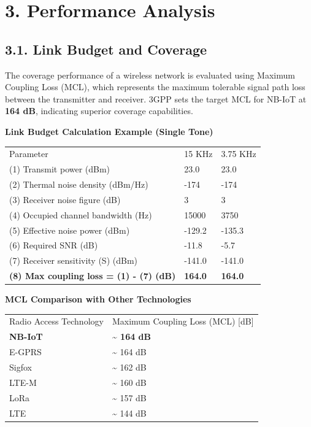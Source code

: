 \documentclass[a4paper, 12pt]{book} %
\begin{document}
\section{3. Performance Analysis}\label{performance-analysis}

\subsection{3.1. Link Budget and
Coverage}\label{link-budget-and-coverage}

The coverage performance of a wireless network is evaluated using
Maximum Coupling Loss (MCL), which represents the maximum tolerable
signal path loss between the transmitter and receiver. 3GPP sets the
target MCL for NB-IoT at \textbf{164 dB}, indicating superior coverage
capabilities.

\textbf{Link Budget Calculation Example (Single Tone)}

\begin{longtable}[]{@{}lll@{}}
\toprule\noalign{}
\endhead
\bottomrule\noalign{}
\endlastfoot
Parameter & 15 KHz & 3.75 KHz \\
(1) Transmit power (dBm) & 23.0 & 23.0 \\
(2) Thermal noise density (dBm/Hz) & -174 & -174 \\
(3) Receiver noise figure (dB) & 3 & 3 \\
(4) Occupied channel bandwidth (Hz) & 15000 & 3750 \\
(5) Effective noise power (dBm) & -129.2 & -135.3 \\
(6) Required SNR (dB) & -11.8 & -5.7 \\
(7) Receiver sensitivity (S) (dBm) & -141.0 & -141.0 \\
\textbf{(8) Max coupling loss = (1) - (7) (dB)} & \textbf{164.0} &
\textbf{164.0} \\
\end{longtable}

\textbf{MCL Comparison with Other Technologies}

\begin{longtable}[]{@{}ll@{}}
\toprule\noalign{}
\endhead
\bottomrule\noalign{}
\endlastfoot
Radio Access Technology & Maximum Coupling Loss (MCL) {[}dB{]} \\
\textbf{NB-IoT} & \textbf{\textasciitilde{} 164 dB} \\
E-GPRS & \textasciitilde{} 164 dB \\
Sigfox & \textasciitilde{} 162 dB \\
LTE-M & \textasciitilde{} 160 dB \\
LoRa & \textasciitilde{} 157 dB \\
LTE & \textasciitilde{} 144 dB \\
\end{longtable}
\end{document}
